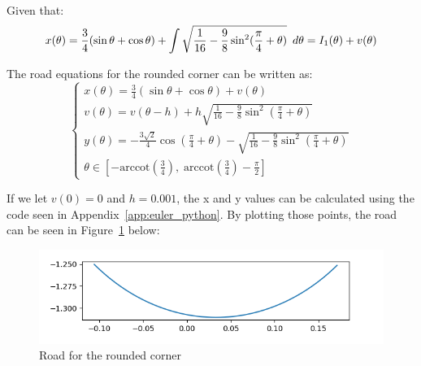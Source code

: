 \documentclass[12pt]{article}
\newcommand{\Hquad}{\hspace{0.5em}}
\begin{document}

 
        Given that:
        \begin{equation}
            x(\theta) = \frac{3}{4} (\sin\theta + \cos\theta) + \int \sqrt{\frac{1}{16} - \frac{9}{8} \sin^2 (\frac{\pi}{4}+\theta)} \Hquad d\theta = I_1(\theta) + v(\theta)
        \end{equation}

        The road equations for the rounded corner can be written as:
        \begin{equation}            
            \begin{cases}
            x(\theta) = \frac{3}{4} (\sin\theta + \cos\theta) + v(\theta) \\ %
            v(\theta) = v(\theta-h) + h \sqrt{\frac{1}{16} - \frac{9}{8} \sin^2 (\frac{\pi}{4}+\theta)} \\
            y(\theta) = - \frac{3\sqrt{2}}{4} \cos (\frac{\pi}{4} + \theta) - \sqrt{\frac{1}{16} - \frac{9}{8} \sin^2 (\frac{\pi}{4}+\theta)} \\
            \theta \in [- \text{arccot}(\frac{3}{4}), \;\text{arccot}(\frac{3}{4}) - \frac{\pi}{2}]
            \end{cases} 
        \end{equation}

        If we let $v(0) = 0$ and $h=0.001$, the x and y values can be calculated using the code seen in Appendix~\ref{app:euler_python}. By plotting those points, the road can be seen in Figure~\ref{fig:corner_road} below:
        \begin{figure}[H]
            \includegraphics[width=\linewidth]{images/corner_road.png}
            \caption{Road for the rounded corner}\label{fig:corner_road}
        \end{figure}
\end{document}
